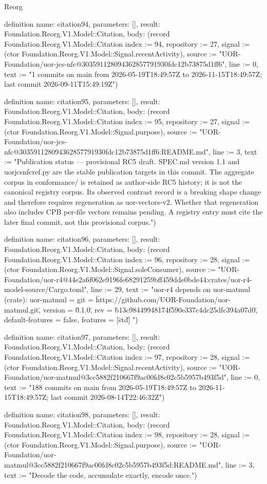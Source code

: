 \begin{lexlean}{Reorg}
\begin{semanticmodule}
definition{
  name: citation94,
  parameters: [],
  result: Foundation.Reorg.V1.Model::Citation,
  body: (record Foundation.Reorg.V1.Model::Citation {index := 94, repository := 27, signal := (ctor Foundation.Reorg.V1.Model::Signal.recentActivity), source := "UOR-Foundation/uor-jcs-nfc@303591128094362857791930fdc12b73875d1ff6", line := 0, text := "1 commits on main from 2026-05-19T18:49:57Z to 2026-11-15T18:49:57Z; last commit 2026-09-11T15:49:19Z"})
}

definition{
  name: citation95,
  parameters: [],
  result: Foundation.Reorg.V1.Model::Citation,
  body: (record Foundation.Reorg.V1.Model::Citation {index := 95, repository := 27, signal := (ctor Foundation.Reorg.V1.Model::Signal.purpose), source := "UOR-Foundation/uor-jcs-nfc@303591128094362857791930fdc12b73875d1ff6:README.md", line := 3, text := "Publication status — provisional RC5 draft. SPEC.md version 1.1 and uorjcsnfcref.py are the stable publication targets in this commit. The aggregate corpus in conformance/ is retained as author-side RC5 history; it is not the canonical registry corpus. Its observed contrast record is a breaking shape change and therefore requires regeneration as uor-vectors-v2. Whether that regeneration also includes CPB per-file vectors remains pending. A registry entry must cite the later final commit, not this provisional corpus."})
}

definition{
  name: citation96,
  parameters: [],
  result: Foundation.Reorg.V1.Model::Citation,
  body: (record Foundation.Reorg.V1.Model::Citation {index := 96, repository := 28, signal := (ctor Foundation.Reorg.V1.Model::Signal.soleConsumer), source := "UOR-Foundation/uor-r4@44e2a6f062e9196fe68291259bff459dde0bde44:crates/uor-r4-model-source/Cargo.toml", line := 29, text := "uor-r4 depends on uor-matmul (crate): uor-matmul = { git = \"https://github.com/UOR-Foundation/uor-matmul.git\", version = \"0.1.0\", rev = \"b13c98449948174f590e337c4dc25dfc394a07d0\", default-features = false, features = [\"std\"] }"})
}

definition{
  name: citation97,
  parameters: [],
  result: Foundation.Reorg.V1.Model::Citation,
  body: (record Foundation.Reorg.V1.Model::Citation {index := 97, repository := 28, signal := (ctor Foundation.Reorg.V1.Model::Signal.recentActivity), source := "UOR-Foundation/uor-matmul@3cc5882f210667f9ac00fd8c02c5b5957b493f5d", line := 0, text := "188 commits on main from 2026-05-19T18:49:57Z to 2026-11-15T18:49:57Z; last commit 2026-08-14T22:46:32Z"})
}

definition{
  name: citation98,
  parameters: [],
  result: Foundation.Reorg.V1.Model::Citation,
  body: (record Foundation.Reorg.V1.Model::Citation {index := 98, repository := 28, signal := (ctor Foundation.Reorg.V1.Model::Signal.purpose), source := "UOR-Foundation/uor-matmul@3cc5882f210667f9ac00fd8c02c5b5957b493f5d:README.md", line := 3, text := "Decode the code, accumulate exactly, encode once."})
}


\end{semanticmodule}
\end{lexlean}
